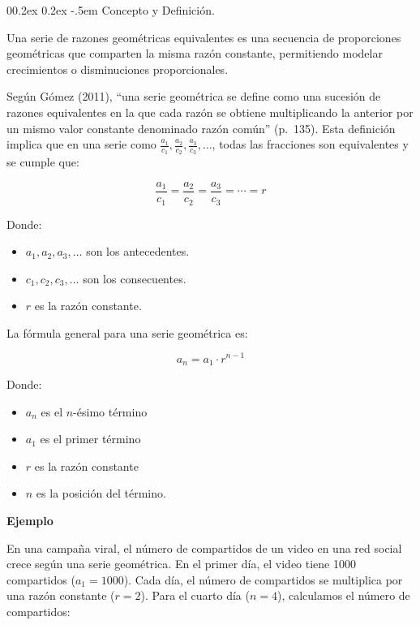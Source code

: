 \documentclass[
  stu,
  floatsintext,
  longtable,
  a4paper,
  nolmodern,
  notxfonts,
  notimes,
  colorlinks=true,linkcolor=blue,citecolor=blue,urlcolor=blue]{apa7}
\makeatletter
\renewcommand{\paragraph}{\@startsection{paragraph}{4}{\parindent}%
	{0\baselineskip \@plus 0.2ex \@minus 0.2ex}%
	{-.5em}%
	{\normalfont\normalsize\bfseries\typesectitle}}
\makeatother
\begin{document}
\paragraph{Concepto y Definición.}\label{concepto-y-definiciuxf3n-2}

Una serie de razones geométricas equivalentes es una secuencia de
proporciones geométricas que comparten la misma razón constante,
permitiendo modelar crecimientos o disminuciones proporcionales.

Según Gómez (2011), ``una serie geométrica se define como una sucesión
de razones equivalentes en la que cada razón se obtiene multiplicando la
anterior por un mismo valor constante denominado razón común'' (p.~135).
Esta definición implica que en una serie como
\(\frac{a_1}{c_1}, \frac{a_2}{c_2}, \frac{a_3}{c_3}, \dots\), todas las
fracciones son equivalentes y se cumple que:

\[
\frac{a_1}{c_1} = \frac{a_2}{c_2} = \frac{a_3}{c_3} = \cdots = r
\]

Donde:

\begin{itemize}
\item
  \(a_1, a_2, a_3, \dots\) son los antecedentes.
\item
  \(c_1, c_2, c_3, \dots\) son los consecuentes.
\item
  \(r\) es la razón constante.
\end{itemize}

La fórmula general para una serie geométrica es:

\[
a_n = a_1 \cdot r^{n-1}
\]

Donde:

\begin{itemize}
\item
  \(a_n\) es el \(n\)-ésimo término
\item
  \(a_1\) es el primer término
\item
  \(r\) es la razón constante
\item
  \(n\) es la posición del término.
\end{itemize}

\textbf{Ejemplo}

En una campaña viral, el número de compartidos de un video en una red
social crece según una serie geométrica. En el primer día, el video
tiene 1000 compartidos (\(a_1 = 1000\)). Cada día, el número de
compartidos se multiplica por una razón constante (\(r = 2\)). Para el
cuarto día (\(n = 4\)), calculamos el número de compartidos:
\end{document}
